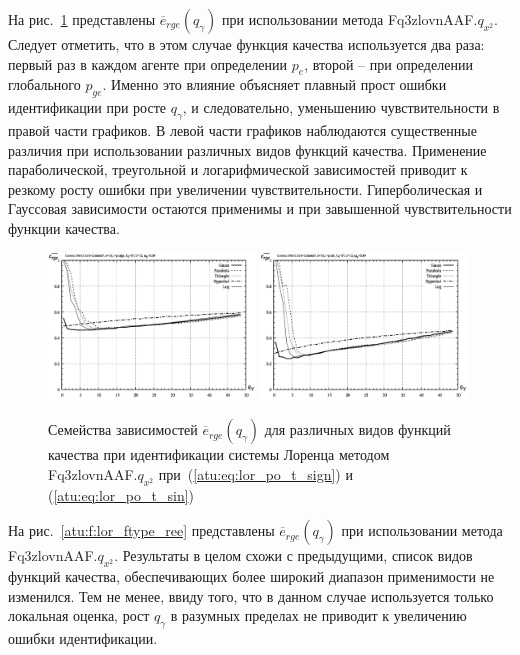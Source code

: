 На рис.~\ref{atu:f:lor_ftype_rge} представлены $\overline{e}_{rge}(q_\gamma)$ 
при использовании метода  Fq3zlovnAAF.$q_{x^2}$.
Следует отметить, что в этом случае функция качества используется два раза:
первый раз в каждом агенте при определении $p_e$,
второй -- при определении глобального $p_{ge}$.
Именно это влияние объясняет плавный прост ошибки идентификации
при росте $q_\gamma$, и следовательно, уменьшению чувствительности в правой части графиков.
В левой части графиков наблюдаются существенные различия
при использовании различных видов функций качества.
Применение параболической, треугольной и логарифмической зависимостей
приводит к резкому росту ошибки при увеличении чувствительности.
Гиперболическая и Гауссовая зависимости остаются применимы и при
завышенной чувствительности функции качества.

\begin{figure}[ht!]
  \centerline{
    \includegraphics[width=0.49\textwidth]{p/cha/lor/Fq3zlovnAAF/f_type/lor_Fq3zlovnAAF_qx2_Ft-p_qg_e_all_sign_rge.png}
    \hfill
    \includegraphics[width=0.49\textwidth]{p/cha/lor/Fq3zlovnAAF/f_type/lor_Fq3zlovnAAF_qx2_Ft-p_qg_e_all_sin_rge.png}
  }
  \caption{Семейства зависимостей $\overline{e}_{rge}(q_\gamma)$ для различных видов функций качества при идентификации системы Лоренца методом Fq3zlovnAAF.$q_{x^2}$
   при~(\ref{atu:eq:lor_po_t_sign}) и (\ref{atu:eq:lor_po_t_sin})}
  \label{atu:f:lor_ftype_rge}
\end{figure}

На рис.~\ref{atu:f:lor_ftype_ree} представлены $\overline{e}_{rge}(q_\gamma)$
при использовании метода  Fq3zlovnAAF.$q_{x^2}$.
Результаты в целом схожи с предыдущими, список видов функций качества, обеспечивающих
более широкий диапазон применимости не изменился. Тем не менее, ввиду того,
что в данном случае используется только локальная оценка, рост
$q_\gamma$ в разумных пределах не приводит к увеличению ошибки идентификации.

